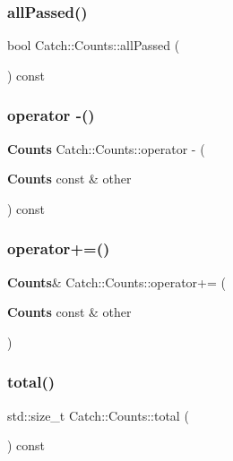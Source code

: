 \mbox{\label{struct_catch_1_1_counts_a84999490e0ecaa3de5e121bf48eda1b3}} 
\subsubsection{allPassed()}
{\footnotesize\ttfamily bool Catch\+::\+Counts\+::all\+Passed (\begin{DoxyParamCaption}{ }\end{DoxyParamCaption}) const}

\mbox{\label{struct_catch_1_1_counts_a954a6bf7a975467774c5f2795bbda0ac}} 
\subsubsection{operator -\/()}
{\footnotesize\ttfamily \textbf{ Counts} Catch\+::\+Counts\+::operator -\/ (\begin{DoxyParamCaption}\item[{\textbf{ Counts} const \&}]{other }\end{DoxyParamCaption}) const}

\mbox{\label{struct_catch_1_1_counts_a322a89475cd2cc039140ef371e973677}} 
\subsubsection{operator+=()}
{\footnotesize\ttfamily \textbf{ Counts}\& Catch\+::\+Counts\+::operator+= (\begin{DoxyParamCaption}\item[{\textbf{ Counts} const \&}]{other }\end{DoxyParamCaption})}

\mbox{\label{struct_catch_1_1_counts_a94f969c09cf52d1339c085c9603cd1d3}} 
\subsubsection{total()}
{\footnotesize\ttfamily std\+::size\+\_\+t Catch\+::\+Counts\+::total (\begin{DoxyParamCaption}{ }\end{DoxyParamCaption}) const}



